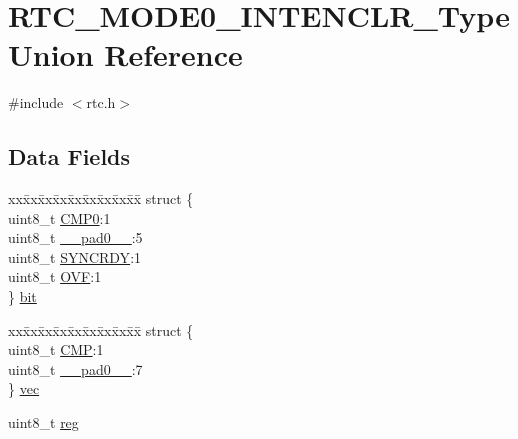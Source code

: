 \hypertarget{union_r_t_c___m_o_d_e0___i_n_t_e_n_c_l_r___type}{}\section{R\+T\+C\+\_\+\+M\+O\+D\+E0\+\_\+\+I\+N\+T\+E\+N\+C\+L\+R\+\_\+\+Type Union Reference}
\label{union_r_t_c___m_o_d_e0___i_n_t_e_n_c_l_r___type}


{\ttfamily \#include $<$rtc.\+h$>$}

\subsection*{Data Fields}
\begin{DoxyCompactItemize}
\item 
\begin{tabbing}
xx\=xx\=xx\=xx\=xx\=xx\=xx\=xx\=xx\=\kill
struct \{\\
\>uint8\_t \mbox{\hyperlink{union_r_t_c___m_o_d_e0___i_n_t_e_n_c_l_r___type_adc7d4e5f43b2e44a828fdfc89f126899}{CMP0}}:1\\
\>uint8\_t \mbox{\hyperlink{union_r_t_c___m_o_d_e0___i_n_t_e_n_c_l_r___type_a8b4eebe79ded0459acec2f4950102ba3}{\_\_pad0\_\_}}:5\\
\>uint8\_t \mbox{\hyperlink{union_r_t_c___m_o_d_e0___i_n_t_e_n_c_l_r___type_aece75e176e4fd55bf68937f1b56bde63}{SYNCRDY}}:1\\
\>uint8\_t \mbox{\hyperlink{union_r_t_c___m_o_d_e0___i_n_t_e_n_c_l_r___type_ac6a3a2f132415ccc7b2b360497b74b15}{OVF}}:1\\
\} \mbox{\hyperlink{union_r_t_c___m_o_d_e0___i_n_t_e_n_c_l_r___type_a12413be3e8742c51b850cb65a811efe6}{bit}}\\

\end{tabbing}\item 
\begin{tabbing}
xx\=xx\=xx\=xx\=xx\=xx\=xx\=xx\=xx\=\kill
struct \{\\
\>uint8\_t \mbox{\hyperlink{union_r_t_c___m_o_d_e0___i_n_t_e_n_c_l_r___type_ac5a98d851fe96017f1c4624476deb57a}{CMP}}:1\\
\>uint8\_t \mbox{\hyperlink{union_r_t_c___m_o_d_e0___i_n_t_e_n_c_l_r___type_a8b4eebe79ded0459acec2f4950102ba3}{\_\_pad0\_\_}}:7\\
\} \mbox{\hyperlink{union_r_t_c___m_o_d_e0___i_n_t_e_n_c_l_r___type_a8307da00e967fdecd8df2320d7103021}{vec}}\\

\end{tabbing}\item 
uint8\+\_\+t \mbox{\hyperlink{union_r_t_c___m_o_d_e0___i_n_t_e_n_c_l_r___type_a9428adc9af4653a2050e2536b55dec8d}{reg}}
\end{DoxyCompactItemize}


